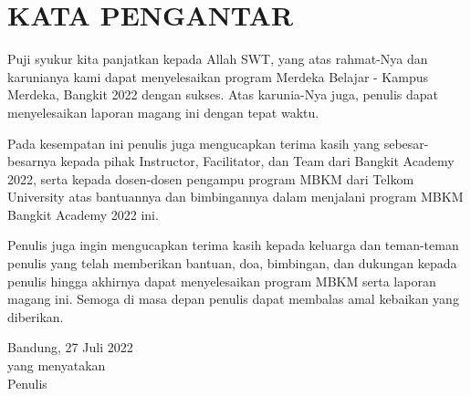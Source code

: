 \chapter*{KATA PENGANTAR}

Puji syukur kita panjatkan kepada Allah SWT, yang atas rahmat-Nya dan karunianya kami dapat menyelesaikan program Merdeka Belajar - Kampus Merdeka, Bangkit 2022 dengan sukses. Atas karunia-Nya juga, penulis dapat menyelesaikan laporan magang ini dengan tepat waktu.

Pada kesempatan ini penulis juga mengucapkan terima kasih yang sebesar-besarnya kepada pihak Instructor, Facilitator, dan Team dari Bangkit Academy 2022, serta kepada dosen-dosen pengampu program MBKM dari Telkom University atas bantuannya dan bimbingannya dalam menjalani program MBKM Bangkit Academy 2022 ini.

Penulis juga ingin mengucapkan terima kasih kepada keluarga dan teman-teman penulis yang telah memberikan bantuan, doa, bimbingan, dan dukungan kepada penulis hingga akhirnya dapat menyelesaikan program MBKM serta laporan magang ini. Semoga di masa depan penulis dapat membalas amal kebaikan yang diberikan.

\bigskip
\begin{flushright}
	Bandung, 27 Juli 2022\\
	yang menyatakan\\
	\bigskip
	Penulis
\end{flushright}
